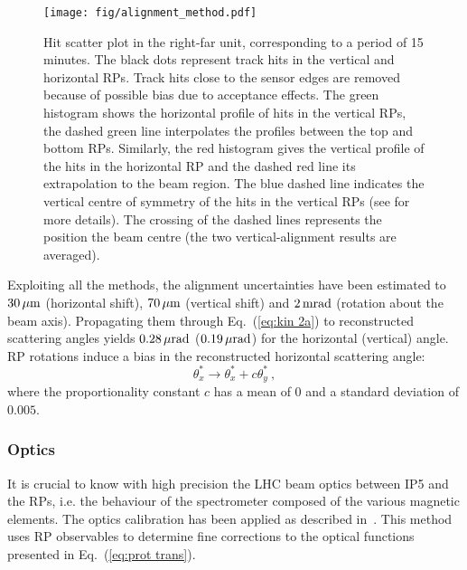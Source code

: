 \begin{figure}
\begin{center}
\texttt{[image: fig/alignment\_method.pdf]}
\caption{%
Hit scatter plot in the right-far unit, corresponding to a period of 15 minutes. The black dots represent track hits in the vertical and horizontal RPs. Track hits close to the sensor edges are removed because of possible bias due to acceptance effects.
The green histogram shows the horizontal profile of hits in the vertical RPs, the dashed green line interpolates the profiles between the top and bottom RPs. Similarly, the red histogram gives the vertical profile of the hits in the horizontal RP and the dashed red line its extrapolation to the beam region. The blue dashed line indicates the vertical centre of symmetry of the hits in the vertical RPs (see \cite{totem-ijmp} for more details). The crossing of the dashed lines represents the position the beam centre (the two vertical-alignment results are averaged).
}
\label{fig:align meth}
\end{center}
\end{figure}

Exploiting all the methods, the alignment uncertainties have been estimated to $30\,{\rm \mu m}$ (horizontal shift), $70\,{\rm \mu m}$ (vertical shift) and $2\,{\rm m rad}$ (rotation about the beam axis). Propagating them through Eq.~(\ref{eq:kin 2a}) to reconstructed scattering angles yields $0.28\,{\rm \mu rad}$ ($0.19\,{\rm \mu rad}$) for the horizontal (vertical) angle. RP rotations induce a bias in the reconstructed horizontal scattering angle:
\begin{equation}
\label{eq:alig rot bias}
	\theta_x^* \rightarrow \theta_x^* + c \theta_y^*\ ,
\end{equation}
where the proportionality constant $c$ has a mean of 0 and a standard deviation of $0.005$.



\subsubsection{Optics}
\label{sec:optics}
It is crucial to know with high precision the LHC beam optics between IP5 and the RPs, i.e. the behaviour of the spectrometer composed of the various magnetic elements.
The optics calibration has been applied as described in~\cite{totem-optics}. This method uses RP observables to determine fine corrections to the optical functions presented in Eq.~(\ref{eq:prot trans}).

